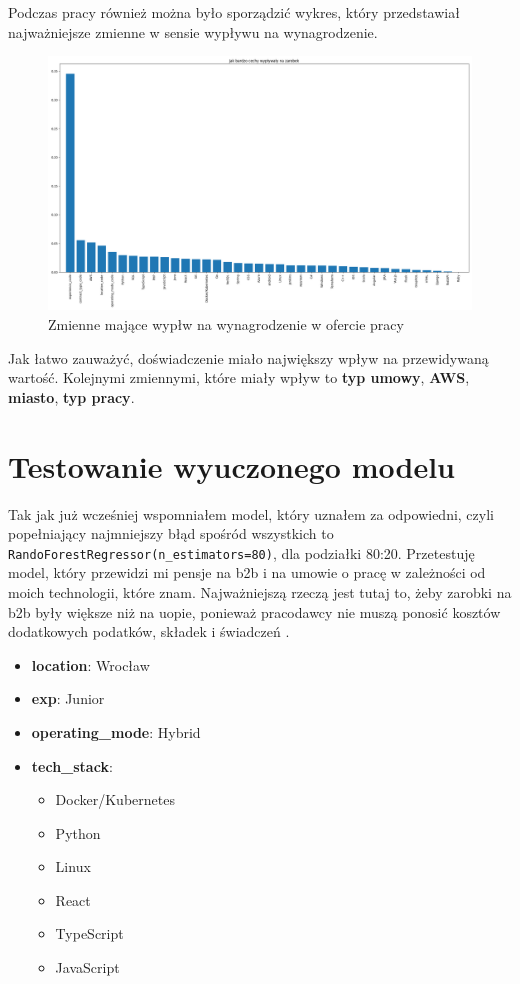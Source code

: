 \documentclass[a4paper]{article}
\begin{document}
\quad Podczas pracy również można było sporządzić wykres, który przedstawiał najważniejsze zmienne w sensie wypływu na wynagrodzenie.

\begin{figure}[H]
    \centering
    \includegraphics[width=\textwidth]{../analysis/plots/wyniki/importance_of_vars.png}
    \caption{Zmienne mające wypłw na wynagrodzenie w ofercie pracy}
\end{figure}

\quad Jak łatwo zauważyć, doświadczenie miało największy wpływ na przewidywaną wartość.
Kolejnymi zmiennymi, które miały wpływ to \textbf{typ umowy}, \textbf{AWS}, \textbf{miasto}, \textbf{typ pracy}.

\section{Testowanie wyuczonego modelu}

\quad Tak jak już wcześniej wspomniałem model, który uznałem za odpowiedni, czyli popełniający najmniejszy błąd
spośród wszystkich to \texttt{RandoForestRegressor(n\_estimators=80)}, dla podziałki 80:20.
Przetestuję model, który przewidzi mi pensje na b2b i na umowie o pracę w zależności od
moich technologii, które znam. Najważniejszą rzeczą jest tutaj to, żeby zarobki na b2b były większe niż na uopie,
ponieważ pracodawcy nie muszą ponosić kosztów dodatkowych podatków, składek i świadczeń \cite{uop_vs_b2b}.

\begin{itemize}
    \item \textbf{location}: Wrocław
    \item \textbf{exp}: Junior
    \item \textbf{operating\_mode}: Hybrid
    \item \textbf{tech\_stack}:
          \begin{itemize}
              \item Docker/Kubernetes
              \item Python
              \item Linux
              \item React
              \item TypeScript
              \item JavaScript
          \end{itemize}
\end{itemize}
\end{document}
